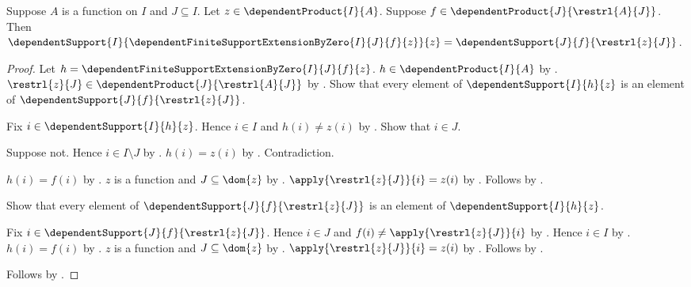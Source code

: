 \begin{theorem}\label{dependent_support_of_extension_by_zero}
    Suppose $A$ is a function on $I$ and $J\subseteq I$.
    Let $z\in\dependentProduct{I}{A}$.
    Suppose $f\in\dependentProduct{J}{\restrl{A}{J}}$.
    Then
        $\dependentSupport{I}{
            \dependentFiniteSupportExtensionByZero{I}{J}{f}{z}}{z}
        =\dependentSupport{J}{f}{\restrl{z}{J}}$.
\end{theorem}
\begin{proof}
    Let $h=\dependentFiniteSupportExtensionByZero{I}{J}{f}{z}$.
    $h\in\dependentProduct{I}{A}$ by
        .
    $\restrl{z}{J}\in\dependentProduct{J}{\restrl{A}{J}}$ by
        .
    Show that every element of $\dependentSupport{I}{h}{z}$ is an
        element of $\dependentSupport{J}{f}{\restrl{z}{J}}$.
    \begin{subproof}
        Fix $i\in\dependentSupport{I}{h}{z}$.
        Hence $i\in I$ and $h(i)\neq z(i)$ by
            .
        Show that $i\in J$.
        \begin{subproof}
            Suppose not.
            Hence $i\in I\setminus J$ by .
            $h(i)=z(i)$ by
                .
            Contradiction.
        \end{subproof}
        $h(i)=f(i)$ by
            .
        $z$ is a function and $J\subseteq\dom{z}$ by
            .
        $\apply{\restrl{z}{J}}{i}=z(i)$ by
            .
        Follows by .
    \end{subproof}
    Show that every element of
        $\dependentSupport{J}{f}{\restrl{z}{J}}$ is an element of
        $\dependentSupport{I}{h}{z}$.
    \begin{subproof}
        Fix $i\in\dependentSupport{J}{f}{\restrl{z}{J}}$.
        Hence $i\in J$ and $f(i)\neq\apply{\restrl{z}{J}}{i}$ by
            .
        Hence $i\in I$ by .
        $h(i)=f(i)$ by
            .
        $z$ is a function and $J\subseteq\dom{z}$ by
            .
        $\apply{\restrl{z}{J}}{i}=z(i)$ by
            .
        Follows by .
    \end{subproof}
    Follows by .
\end{proof}

